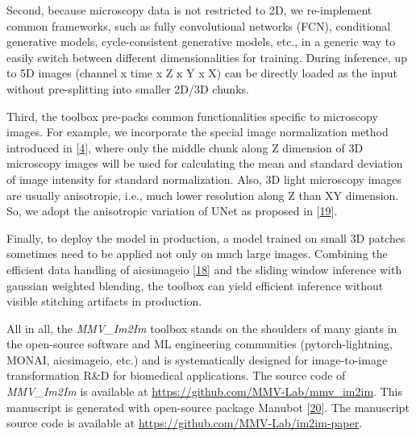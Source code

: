 Second, because microscopy data is not restricted to 2D, we re-implement common frameworks, such as fully convolutional networks (FCN), conditional generative models, cycle-consistent generative models, etc., in a generic way to easily switch between different dimensionalities for training. During inference, up to 5D images (channel x time x Z x Y x X) can be directly loaded as the input without pre-splitting into smaller 2D/3D chunks.

Third, the toolbox pre-packs common functionalities specific to microscopy images. For example, we incorporate the special image normalization method introduced in {[}\protect\hyperlink{ref-Yq8wZ6hc}{4}{]}, where only the middle chunk along Z dimension of 3D microscopy images will be used for calculating the mean and standard deviation of image intensity for standard normalization. Also, 3D light microscopy images are usually anisotropic, i.e., much lower resolution along Z than XY dimension. So, we adopt the anisotropic variation of UNet as proposed in {[}\protect\hyperlink{ref-jM3v1UjQ}{19}{]}.

Finally, to deploy the model in production, a model trained on small 3D patches sometimes need to be applied not only on much large images. Combining the efficient data handling of aicsimageio {[}\protect\hyperlink{ref-ONdyoUIo}{18}{]} and the sliding window inference with gaussian weighted blending, the toolbox can yield efficient inference without visible stitching artifacts in production.

All in all, the \emph{MMV\_Im2Im} toolbox stands on the shoulders of many giants in the open-source software and ML engineering communities (pytorch-lightning, MONAI, aicsimageio, etc.) and is systematically designed for image-to-image transformation R\&D for biomedical applications. The source code of \emph{MMV\_Im2Im} is available at \url{https://github.com/MMV-Lab/mmv_im2im}. This manuscript is generated with open-source package Manubot {[}\protect\hyperlink{ref-YuJbg3zO}{20}{]}. The manuscript source code is available at \url{https://github.com/MMV-Lab/im2im-paper}.

